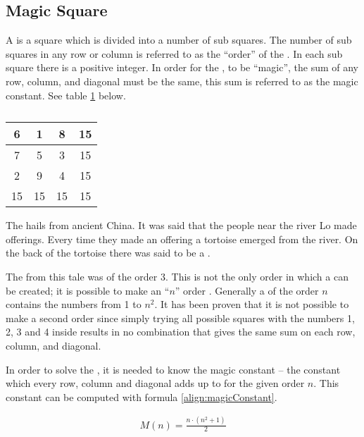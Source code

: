 \subsection{Magic Square}
\label{sec:magicSquare}
A \msquare{} is a square which is divided into a number of sub squares. The number of sub squares in any row or column is referred to as the ``order'' of the \msquare{}. In each sub square there is a positive integer. In order for the \msquare{}, to be ``magic'', the sum of any row, column, and diagonal must be the same, this sum is referred to as the magic constant. See table \ref{tab:magicSquareOrder3} below.

\renewcommand{\arraystretch}{1.3}
\begin{table}[h]
	\centering
		\begin{tabular}{|c|c|c |@{\vrules}| c|}
			\hline
			6&1&8&15 \\
			\hline
			7&5&3&15 \\
			\hline
			2&9&4&15 \\
			\noalign{\hrules}
			15&15&15&15 \\
			\hline
		\end{tabular}
	\caption{}
	\label{tab:magicSquareOrder3}
\end{table}

The \msquare{} \cite{aiden06} hails from ancient China. It was said that the people near the river Lo made offerings. Every time they made an offering a tortoise emerged from the river. On the back of the tortoise there was said to be a \msquare{}.

The \msquare{} from this tale was of the order 3. This is not the only order in which a \msquare{} can be created; it is possible to make an ``$n$'' order \msquare{}. Generally a \msquare{} of the order $n$ contains the numbers from 1 to $n^2$. It has been proven that it is not possible to make a second order \msquare{} since simply trying all possible squares with the numbers 1, 2, 3 and 4 inside results in no combination that gives the same sum on each row, column, and diagonal.

In order to solve the \msquare{}, it is needed to know the magic constant -- the constant which every row, column and diagonal adds up to for the given order $n$. This constant can be computed with formula \ref{align:magicConstant}.

\begin{align}
\label{align:magicConstant}
	M(n) = \frac{n \cdot (n^2+1)}{2}
\end{align}

